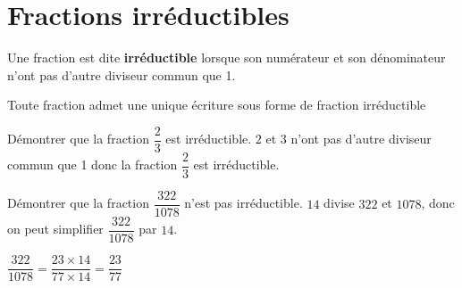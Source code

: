 \section{Fractions irréductibles}
\begin{definition}
    Une fraction est dite \textbf{irréductible} lorsque son numérateur et son dénominateur n'ont pas d'autre diviseur commun que 1.
\end{definition}

\begin{propriete}[\admise]
    Toute fraction admet une unique écriture sous forme de fraction irréductible
\end{propriete}

\begin{exemple}
    Démontrer que la fraction $\dfrac23$ est irréductible.
    \correction
    $2$ et $3$ n'ont pas d'autre diviseur commun que 1 donc la fraction $\dfrac23$ est irréductible.
\end{exemple}
\begin{exemple}
    Démontrer que la fraction $\dfrac{322}{\num{1078}}$ n'est pas irréductible.
    \correction    
    $14$ divise $322$ et $\num{1078}$, donc on peut simplifier $\dfrac{322}{\num{1078}}$ par $14$.

    \medskip    
    $\dfrac{322}{\num{1078}}=\dfrac{23\times14}{77\times14}=\dfrac{23}{77}$
\end{exemple}
